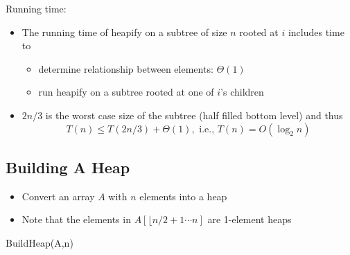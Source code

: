 Running time:
\begin{itemize}
    \item The running time of heapify on a subtree of size $n$ rooted at $i$ includes time to 
    \begin{itemize}
        \item determine relationship between elements: $\Theta(1)$
        \item run heapify on a subtree rooted at one of $i$'s children
    \end{itemize}
    \item $2n/3$ is the worst case size of the subtree (half filled bottom level) and thus \[
    T(n) \leq T(2n/3)+\Theta(1), \text{ i.e., } T(n)=O(\log_2 n)
    \]
\end{itemize}

\subsection{Building A Heap}
\begin{itemize}
    \item Convert an array $A$ with $n$ elements into a heap
    \item Note that the elements in $A \left[ \lfloor n/2 + 1 \cdots n \right]$ are 1-element heaps
\end{itemize}

\begin{center}
\begin{minipage}{0.6\textwidth} %
\centering %
\begin{algorithm}[H]
\caption{BuildHeap(A,n)}
\end{algorithm}
\end{minipage}
\end{center}

